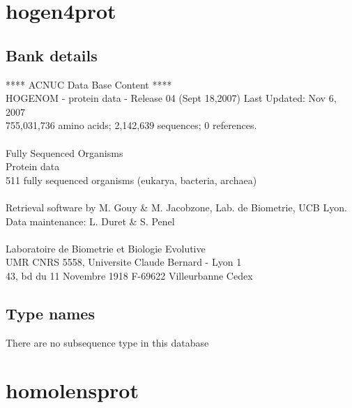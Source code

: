 \documentclass{article}
\begin{document}
\begin{Schunk}
\section{ hogen4prot }
\subsection{Bank details}
               ****     ACNUC Data Base Content      ****                      \\
 HOGENOM - protein data - Release 04 (Sept 18,2007) Last Updated: Nov  6, 2007\\
          755,031,736 amino acids; 2,142,639 sequences; 0 references.\\
                                                                               \\
                        Fully Sequenced Organisms\\
   				Protein data \\
	  511 fully sequenced organisms (eukarya, bacteria, archaea)\\
\\
Retrieval software by M. Gouy \& M. Jacobzone, Lab. de Biometrie, UCB Lyon.\\
Data maintenance: L. Duret \& S. Penel\\
\\
Laboratoire de Biometrie et Biologie Evolutive\\
UMR CNRS 5558, Universite Claude Bernard - Lyon 1 \\
43, bd du 11 Novembre 1918 F-69622 Villeurbanne Cedex\\


\subsection{Type names}
There are no subsequence type in this database
\section{ homolensprot }

\end{Schunk}
\end{document}
